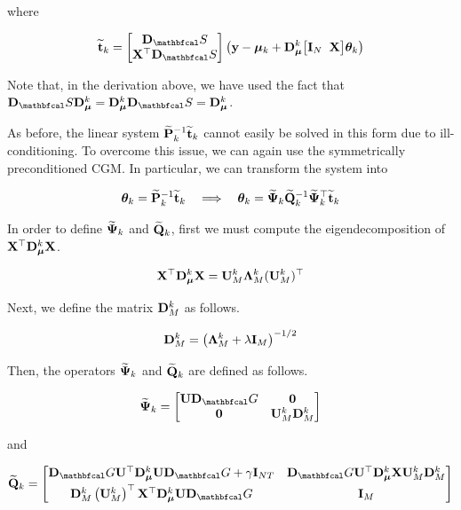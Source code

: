 where 

\begin{equation}
    \widetilde{\tee}_k = \begin{bmatrix}
        \D_\St \\ \X^\top \D_\St
    \end{bmatrix} \left(\y - \muu_k + \D_{\muu}^k \big[\I_N \;\; \X \big] \thetaa_k \right)
\end{equation}

Note that, in the derivation above, we have used the fact that $\D_\St \D_{\muu}^k = \D_{\muu}^k \D_\St = \D_{\muu}^k$. 

As before, the linear system $\widetilde{\mathbf{P}}_k^{-1} \widetilde{\mathbf{t}}_k $ cannot easily be solved in this form due to ill-conditioning. To overcome this issue, we can again use the symmetrically preconditioned CGM. In particular, we can transform the system into 

\begin{equation*}
    \boldsymbol{\theta}_k = \widetilde{\mathbf{P}}^{-1}_k \widetilde{\mathbf{t}}_k \quad \Longrightarrow \quad \boldsymbol{\theta}_k = \widetilde{\mathbf{\Psi}}_k \widetilde{\mathbf{Q}}_k^{-1} \widetilde{\mathbf{\Psi}}_k^\top \widetilde{\mathbf{t}}_k
\end{equation*}

In order to define $\widetilde{\mathbf{\Psi}}_k$ and $\widetilde{\mathbf{Q}}_k$, first we must compute the eigendecomposition of $\mathbf{X}^\top \mathbf{D}_{\boldsymbol{\mu}}^k \mathbf{X}$. 

\begin{equation}
    \mathbf{X}^\top \mathbf{D}_{\boldsymbol{\mu}}^k \mathbf{X} = \mathbf{U}_M^k \mathbf{\Lambda}_M^k (\mathbf{U}_M^k)^\top 
\end{equation}

Next, we define the matrix $\mathbf{D}_M^k$ as follows. 

\begin{equation}
    \mathbf{D}_M^k = \left(\mathbf{\Lambda}_M^k + \lambda \mathbf{I}_M\right)^{-1/2}
\end{equation}

Then, the operators $\widetilde{\mathbf{\Psi}}_k$ and $\widetilde{\mathbf{Q}}_k$ are defined as follows. 

\begin{equation}
    \widetilde{\PSI}_k = \begin{bmatrix}
        \U \D_\Gt & \zero \\
        \zero & \U_M^k \D_M^k
    \end{bmatrix}
\end{equation}

and 

\begin{equation}
    \widetilde{\Q}_k = 
       \begin{bmatrix}
        \D_\Gt \U^\top \D_{\muu}^k \U \D_\Gt + \gamma \I_{NT}  &  \D_\Gt \U^\top \D_{\muu}^k \X \U_M^k \D_M^k \\[0.1cm] 
        \D_M^k \left(\U_M^k\right)^\top \X^\top \D_{\muu}^k \U \D_\Gt & \I_M
        \end{bmatrix}
\end{equation}

